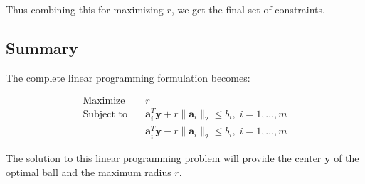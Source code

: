 \documentclass{article}
\begin{document}
Thus combining this for maximizing $r$, we get the final set of constraints.

\subsection*{Summary}
The complete linear programming formulation becomes:

\begin{align*}
\text{Maximize} & \quad r \\
\text{Subject to} & \quad \mathbf{a}_i^T \mathbf{y} + r \|\mathbf{a}_i\|_2 \leq b_i, \; i = 1, \ldots, m \\
& \quad \mathbf{a}_i^T \mathbf{y} - r \|\mathbf{a}_i\|_2 \leq b_i, \; i = 1, \ldots, m
\end{align*}

The solution to this linear programming problem will provide the center $\mathbf{y}$ of the optimal ball and the maximum radius $r$.
\end{document}
